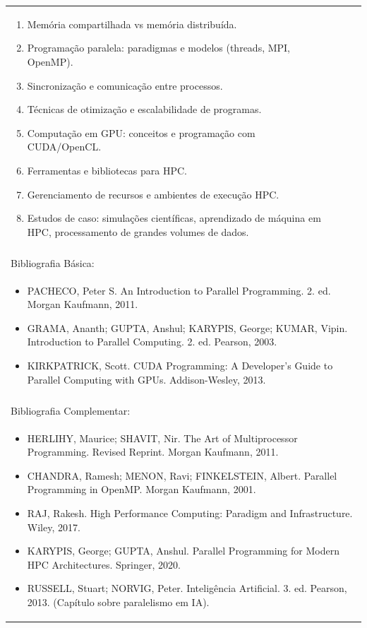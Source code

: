\documentclass[11pt]{article}
\begin{document}
\begin{center}
\begin{longtable}{|p{4cm}|p{4cm}|p{4cm}|p{4cm}|}
{\begin{enumerate}
\item Memória compartilhada vs memória distribuída.
\item Programação paralela: paradigmas e modelos (threads, MPI, OpenMP).
\item Sincronização e comunicação entre processos.
\item Técnicas de otimização e escalabilidade de programas.
\item Computação em GPU: conceitos e programação com CUDA/OpenCL.
\item Ferramentas e bibliotecas para HPC.
\item Gerenciamento de recursos e ambientes de execução HPC.
\item Estudos de caso: simulações científicas, aprendizado de máquina em HPC, processamento de grandes volumes de dados.\end{enumerate}}\\
\multicolumn{4}{|p{16cm}|}{}\\
\hline
\multicolumn{4}{|p{16cm}|}{Bibliografia Básica:}\\
\multicolumn{4}{|p{\dimexpr 16cm + 6\tabcolsep\relax}|}{%
\begin{itemize}\item PACHECO, Peter S. An Introduction to Parallel Programming. 2. ed. Morgan Kaufmann, 2011.
\item GRAMA, Ananth; GUPTA, Anshul; KARYPIS, George; KUMAR, Vipin. Introduction to Parallel Computing. 2. ed. Pearson, 2003.
\item KIRKPATRICK, Scott. CUDA Programming: A Developer's Guide to Parallel Computing with GPUs. Addison-Wesley, 2013.\end{itemize}}\\
\multicolumn{4}{|p{16cm}|}{}\\
\hline
\multicolumn{4}{|p{16cm}|}{Bibliografia Complementar:}\\
\multicolumn{4}{|p{\dimexpr 16cm + 6\tabcolsep\relax}|}{%
\begin{itemize}\item HERLIHY, Maurice; SHAVIT, Nir. The Art of Multiprocessor Programming. Revised Reprint. Morgan Kaufmann, 2011.
\item CHANDRA, Ramesh; MENON, Ravi; FINKELSTEIN, Albert. Parallel Programming in OpenMP. Morgan Kaufmann, 2001.
\item RAJ, Rakesh. High Performance Computing: Paradigm and Infrastructure. Wiley, 2017.
\item KARYPIS, George; GUPTA, Anshul. Parallel Programming for Modern HPC Architectures. Springer, 2020.
\item RUSSELL, Stuart; NORVIG, Peter. Inteligência Artificial. 3. ed. Pearson, 2013. (Capítulo sobre paralelismo em IA).\end{itemize}}\\
\hline
\end{longtable}
\end{center}
\end{document}
